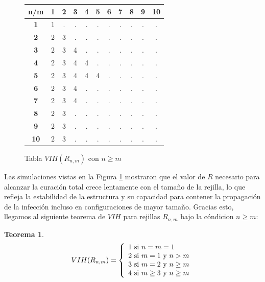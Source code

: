 \documentclass[12pt,titlepage,twoside,openright]{book}
\newtheorem{theorem}{Teorema}[section]
\begin{document}
\begin{figure}[h]
    \centering
    \begin{tabular}{|c|cccccccccc|}
        \hline
        \textbf{n/m} & \textbf{1} & \textbf{2} & \textbf{3} & \textbf{4} & \textbf{5} & \textbf{6} & \textbf{7} & \textbf{8} & \textbf{9} & \textbf{10} \\
        \hline
        \textbf{1} & 1 & . & . & . & . & . & . & . & . & . \\
        \textbf{2} & 2 & 3 & . & . & . & . & . & . & . & . \\
        \textbf{3} & 2 & 3 & 4 & . & . & . & . & . & . & . \\
        \textbf{4} & 2 & 3 & 4 & 4 & . & . & . & . & . & . \\
        \textbf{5} & 2 & 3 & 4 & 4 & 4 & . & . & . & . & . \\
        \textbf{6} & 2 & 3 & 4 & . & . & . & . & . & . & . \\
        \textbf{7} & 2 & 3 & 4 & . & . & . & . & . & . & . \\
        \textbf{8} & 2 & 3 & . & . & . & . & . & . & . & . \\
        \textbf{9} & 2 & 3 & . & . & . & . & . & . & . & . \\
        \textbf{10} & 2 & 3 & . & . & . & . & . & . & . & . \\
        \hline
    \end{tabular}
    \caption{Tabla $VIH(R_{n,m})$ con $n\geq m$}
    \label{tabla:VIH(R_n,m)n>=m}
\end{figure}
Las simulaciones vistas en la Figura \ref{tabla:VIH(R_n,m)n>=m} mostraron que el valor de $R$ necesario para alcanzar la curaci\'on total crece lentamente con el tama\~no de la rejilla, lo que refleja la estabilidad de la estructura y su capacidad para contener la propagaci\'on de la infecci\'on incluso en configuraciones de mayor tama\~no. Gracias esto, llegamos al siguiente teorema de $VIH$ para rejillas $R_{n,m}$ bajo la c\'ondicion $n\geq m$:

\begin{theorem}\label{Con:VIH(Rn,m)}
    $$
    VIH(R_{n,m}) = \left\lbrace
    \begin{array}{ll}
        1 \textup{ si } n=m=1\\
        2 \textup{ si } m=1 \textup{ y } n > m\\
        3 \textup{ si } m=2 \textup{ y } n \geq m\\
        4 \textup{ si } m\geq 3 \textup{ y } n \geq m
    \end{array}
    \right.
    $$
\end{theorem}
\end{document}
